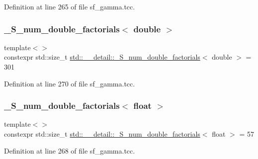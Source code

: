 Definition at line 265 of file sf\+\_\+gamma.\+tcc.

\mbox{\label{namespacestd_1_1____detail_ae829eb6434a90060ee0650f1c71fb92d}} 
\subsubsection{\texorpdfstring{\+\_\+\+S\+\_\+num\+\_\+double\+\_\+factorials$<$ double $>$}{\_S\_num\_double\_factorials< double >}}
{\footnotesize\ttfamily template$<$$>$ \\
constexpr std\+::size\+\_\+t \hyperlink{namespacestd_1_1____detail_a762f5ed905d1f926bfd8b16f8ea2c568}{std\+::\+\_\+\+\_\+detail\+::\+\_\+\+S\+\_\+num\+\_\+double\+\_\+factorials}$<$ double $>$ = 301}



Definition at line 270 of file sf\+\_\+gamma.\+tcc.

\mbox{\label{namespacestd_1_1____detail_ac55fdd5d901fcd9335503b16ec897444}} 
\subsubsection{\texorpdfstring{\+\_\+\+S\+\_\+num\+\_\+double\+\_\+factorials$<$ float $>$}{\_S\_num\_double\_factorials< float >}}
{\footnotesize\ttfamily template$<$$>$ \\
constexpr std\+::size\+\_\+t \hyperlink{namespacestd_1_1____detail_a762f5ed905d1f926bfd8b16f8ea2c568}{std\+::\+\_\+\+\_\+detail\+::\+\_\+\+S\+\_\+num\+\_\+double\+\_\+factorials}$<$ float $>$ = 57}



Definition at line 268 of file sf\+\_\+gamma.\+tcc.

